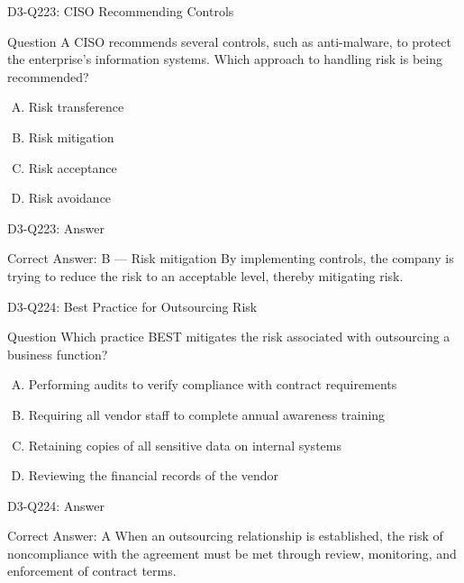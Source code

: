 \documentclass{beamer}
\begin{document}
	\begin{frame}{D3-Q223: CISO Recommending Controls}
		\begin{block}{Question}
			A CISO recommends several controls, such as anti-malware, to protect the enterprise's information systems. Which approach to handling risk is being recommended?
		\end{block}
		\begin{enumerate}[(A)]
			\item Risk transference
			\item Risk mitigation
			\item Risk acceptance
			\item Risk avoidance
		\end{enumerate}
	\end{frame}
	\begin{frame}{D3-Q223: Answer}
		\begin{block}{Correct Answer: B --- Risk mitigation}
			By implementing controls, the company is trying to reduce the risk to an acceptable level, thereby mitigating risk.
		\end{block}
	\end{frame}
	
	\begin{frame}{D3-Q224: Best Practice for Outsourcing Risk}
		\begin{block}{Question}
			Which practice BEST mitigates the risk associated with outsourcing a business function?
		\end{block}
		\begin{enumerate}[(A)]
			\item Performing audits to verify compliance with contract requirements
			\item Requiring all vendor staff to complete annual awareness training
			\item Retaining copies of all sensitive data on internal systems
			\item Reviewing the financial records of the vendor
		\end{enumerate}
	\end{frame}
	\begin{frame}{D3-Q224: Answer}
		\begin{block}{Correct Answer: A}
			When an outsourcing relationship is established, the risk of noncompliance with the agreement must be met through review, monitoring, and enforcement of contract terms.
		\end{block}
	\end{frame}
	
\end{document}
